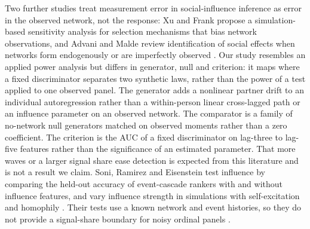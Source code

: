 Two further studies treat measurement error in social-influence inference as error in the observed network, not the response: Xu and Frank propose a simulation-based sensitivity analysis for selection mechanisms that bias network observations, and Advani and Malde review identification of social effects when networks form endogenously or are imperfectly observed \cite{xu2021sensitivity,advani2018credibly}.
Our study resembles an applied power analysis but differs in generator, null and criterion: it maps where a fixed discriminator separates two synthetic laws, rather than the power of a test applied to one observed panel.
The generator adds a nonlinear partner drift to an individual autoregression rather than a within-person linear cross-lagged path or an influence parameter on an observed network. The comparator is a family of no-network null generators matched on observed moments rather than a zero coefficient. The criterion is the AUC of a fixed discriminator on lag-three to lag-five features rather than the significance of an estimated parameter.
That more waves or a larger signal share ease detection is expected from this literature and is not a result we claim.
Soni, Ramirez and Eisenstein test influence by comparing the held-out accuracy of event-cascade rankers with and without influence features, and vary influence strength in simulations with self-excitation and homophily \cite{soni2019rankers}.
Their tests use a known network and event histories, so they do not provide a signal-share boundary for noisy ordinal panels \cite{soni2019rankers}.

